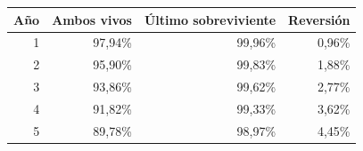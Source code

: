 \begin{tabular}{@{}rrrr@{}}
\toprule
Año & Ambos vivos & Último sobreviviente & Reversión \\
\midrule
1 & 97,94\% & 99,96\% & 0,96\% \\
2 & 95,90\% & 99,83\% & 1,88\% \\
3 & 93,86\% & 99,62\% & 2,77\% \\
4 & 91,82\% & 99,33\% & 3,62\% \\
5 & 89,78\% & 98,97\% & 4,45\% \\
\bottomrule
\end{tabular}
